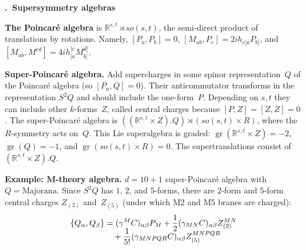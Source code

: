\documentclass[10pt,letterpaper]{article}
\renewcommand{\section}[1]{\stepcounter{section}\medskip\pagebreak[1]\noindent\textbf{\large\arabic{section}.\ #1}\smallskip}
\renewcommand{\paragraph}[1]{\textbf{#1}}
\begin{document}
\section{Supersymmetry algebras}

\paragraph{The Poincar\'e algebra} is $\mathbb{R}^{s,t} \rtimes so(s,t)$, the semi-direct product of translations by rotations.
Namely, $[P_{a},P_{b}]=0$, $[M_{ab},P_{c}]=2ih_{c[a}P_{b]}$, and $[M_{ab},M^{cd}]=4ih_{[a}^{[c}M_{b]}^{d]}$.

\smallskip

\paragraph{Super-Poincar\'e algebra.}
Add supercharges in some spinor representation~$Q$ of the Poincar\'e algebra (so $[P_{a},Q]=0$).
Their anticommutator transforms in the representation $S^2 Q$ and should include the one-form~$P$.
Depending on $s,t$ they can include other $k$-forms~$Z$, called central charges because $[P,Z]=[Z,Z]=0$.
The super-Poincar\'e algebra is $((\mathbb{R}^{s,t}\times Z).Q)\rtimes (so(s,t)\times R)$, where the $R$-symmetry acts on~$Q$.
This Lie superalgebra is graded: $\operatorname{gr}(\mathbb{R}^{s,t}\times Z)=-2$, $\operatorname{gr}(Q)=-1$, and $\operatorname{gr}(so(s,t)\times R)=0$.
The supertranslations consist of $(\mathbb{R}^{s,t}\times Z).Q$.

\smallskip

\paragraph{Example: M-theory algebra.}  $d=10+1$ super-Poincar\'e algebra with $Q=\text{Majorana}$.
Since $S^2 Q$ has $1$, $2$, and $5$-forms, there are $2$-form and $5$-form central charges $Z_{(2)}$ and~$Z_{(5)}$
(under which M2 and M5 branes are charged):
\vspace{-.5\baselineskip}
\begin{align*}
\{Q_{\alpha},Q_{\beta}\}&=(\gamma^{M}C)_{\alpha\beta} P_{M}+\frac{1}{2}(\gamma_{MN}C)_{\alpha\beta} Z_{(2)}^{MN}\\[-.5\baselineskip]
& \quad + \frac{1}{5!}(\gamma_{MNPQR}C)_{\alpha\beta} Z_{(5)}^{MNPQR}
\end{align*}
\vspace{-1\baselineskip}
\end{document}
